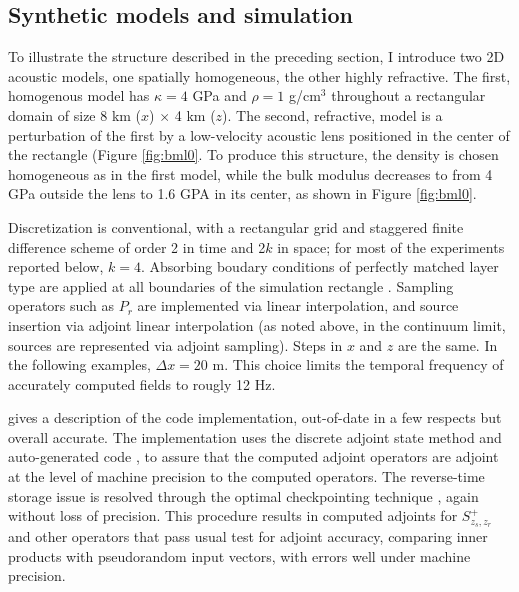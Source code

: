 \documentclass[georeport,12pt]{geophysics}
\begin{document}
\subsection{Synthetic models and simulation}
To illustrate the structure described in the preceding section, I
introduce two 2D acoustic models, one spatially homogeneous, the other
highly refractive. The first, homogenous model has $\kappa = 4$
GPa and $\rho = 1$ g/cm$^3$ throughout a rectangular domain of size 8 km ($x$) $\times$ 4 km
($z$). The second, refractive, model is a perturbation of the first by
a low-velocity acoustic lens positioned in the center of the
rectangle (Figure \ref{fig:bml0}. To produce this structure, the density is chosen
homogeneous as in the first model, while the bulk modulus decreases to
from 4 GPa outside the lens to 1.6 GPA in its center, as shown in Figure \ref{fig:bml0}.


Discretization is conventional, with a rectangular grid and staggered
finite difference scheme \cite[]{Vir:84} of order 2 in time and
2$k$ in space; for most of the experiments reported below,
$k=4$. Absorbing boudary conditions of perfectly matched layer type
are applied at all boundaries of the simulation rectangle \cite[]{Habashy:07}.
Sampling operators such as $P_r$ are implemented via linear
interpolation, and source insertion via adjoint linear interpolation
(as noted above, in the continuum limit, sources are represented via
adjoint sampling). Steps in $x$ and $z$ are the same. In the following
examples, $\Delta x = 20$ m. This choice limits the temporal frequency
of accurately computed fields to rougly 12 Hz.

\cite{GeoPros:11} gives a description of the code
implementation, out-of-date in a few respects but overall accurate.
The implementation uses the discrete adjoint state method and
auto-generated code \cite[]{TapenadeRef13}, to assure that the
computed adjoint operators are adjoint at the level of machine
precision to the computed operators. The reverse-time storage issue is
resolved through the optimal checkpointing technique
\cite[]{Griewank:book,Symes:06a-pub}, again without loss of
precision. This procedure results in computed adjoints for
$S^+_{z_s,z_r}$ and other operators that pass usual test for adjoint
accuracy, comparing inner products with pseudorandom input vectors,
with errors well under machine precision.
\end{document}
